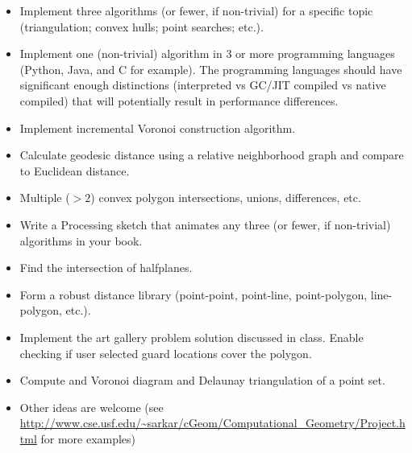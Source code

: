 \documentclass[a4paper,12pt]{article}
\begin{document}
\begin{itemize}
    \item Implement three algorithms (or fewer, if non-trivial) for a specific topic (triangulation; convex hulls; point searches; etc.).
    \item Implement one (non-trivial) algorithm in 3 or more programming languages (Python, Java, and C for example). The programming languages should have significant enough distinctions (interpreted vs GC/JIT compiled vs native compiled) that will potentially result in performance differences.
    \item Implement incremental Voronoi construction algorithm.
    \item Calculate geodesic distance using a relative neighborhood graph and compare to Euclidean distance.
    \item Multiple ($>2$) convex polygon intersections, unions, differences, etc.
    \item Write a Processing sketch that animates any three (or fewer, if non-trivial) algorithms in your book. 
    \item Find the intersection of halfplanes.
    \item Form a robust distance library (point-point, point-line, point-polygon, line-polygon, etc.).
    \item Implement the art gallery problem solution discussed in class. Enable checking if user selected guard locations cover the polygon.
    \item Compute and Voronoi diagram and Delaunay triangulation of a point set.
    \item Other ideas are welcome (see \url{http://www.cse.usf.edu/~sarkar/cGeom/Computational_Geometry/Project.html} for more examples)
\end{itemize}
\end{document}
